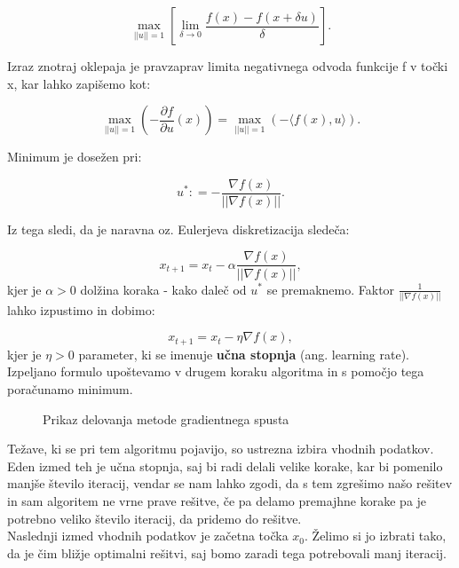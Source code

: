 \documentclass{article}
\begin{document}
\[\max_{||u||=1} \left [\lim_{\delta \to 0} \frac{f(x)-f(x+\delta u)}{\delta}\right].\]

\noindent Izraz znotraj oklepaja je pravzaprav limita negativnega odvoda funkcije f v točki x, kar lahko zapišemo kot:

\[\max_{||u||=1} \left (- \frac{\partial f}{\partial u} (x) \right) = \max_{||u||=1} \left (- \langle f(x) , u \rangle \right) .\]

\noindent Minimum je dosežen pri:

\[ u^* : = - \frac{\nabla f(x)}{||\nabla f(x)||}.\]

\noindent Iz tega sledi, da je naravna oz. Eulerjeva diskretizacija sledeča:

\[ x_{t+1} = x_t - \alpha \frac{\nabla f(x)}{||\nabla f(x)||},\]
kjer je $\alpha > 0$ dolžina koraka - kako daleč od $u^*$ se premaknemo. Faktor $\frac{1}{||\nabla f(x)||}$ lahko izpustimo in dobimo:

\[ x_{t+1} = x_t - \eta {\nabla f(x)},\]
kjer je $\eta > 0$ parameter, ki se imenuje \textbf{učna stopnja} (ang. learning rate).
Izpeljano formulo upoštevamo v drugem koraku algoritma in s pomočjo tega poračunamo minimum.

\begin{figure}[h]
\centering
{}
\caption{Prikaz delovanja metode gradientnega spusta}
\label{fig:foobar}
\end{figure}


\noindent Težave, ki se pri tem algoritmu pojavijo, so ustrezna izbira vhodnih podatkov. Eden izmed teh je učna stopnja, saj bi radi delali velike korake, kar bi pomenilo manjše število iteracij, vendar se nam lahko zgodi, da s tem zgrešimo našo rešitev in sam algoritem ne vrne prave rešitve, če pa delamo premajhne korake pa je potrebno veliko število iteracij, da pridemo do rešitve. \\
Naslednji izmed vhodnih podatkov je začetna točka $x_0$. Želimo si jo izbrati tako, da je čim bližje optimalni rešitvi, saj bomo zaradi tega potrebovali manj iteracij.
\end{document}
